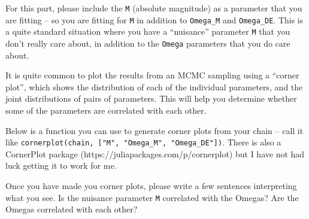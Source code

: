 \documentclass[11pt]{article}
\begin{document}
For this part, please include the \texttt{M} (absolute magnitude) as a
parameter that you are fitting -- so you are fitting for \texttt{M} in
addition to \texttt{Omega\_M} and \texttt{Omega\_DE}. This is a quite
standard situation where you have a ``nuisance'' parameter \texttt{M}
that you don't really care about, in addition to the \texttt{Omega}
parameters that you do care about.

    It is quite common to plot the results from an MCMC sampling using a
``corner plot'', which shows the distribution of each of the individual
parameters, and the joint distributions of pairs of parameters. This
will help you determine whether some of the parameters are correlated
with each other.

Below is a function you can use to generate corner plots from your chain
-- call it like
\texttt{cornerplot(chain,\ {[}"M",\ "Omega\_M",\ "Omega\_DE"{]})}. There
is also a CornerPlot package (https://juliapackages.com/p/cornerplot)
but I have not had luck getting it to work for me.

Once you have made you corner plots, please write a few sentences
interpreting what you see. Is the nuisance parameter \texttt{M}
correlated with the Omegas? Are the Omegas correlated with each other?
\end{document}
